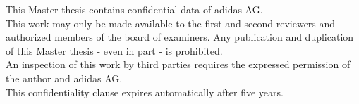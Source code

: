 



This Master thesis contains confidential data of adidas AG. 
\\
This work may only be made available to the first and second reviewers and authorized members of the board of examiners. Any publication and duplication of this Master thesis - even in part - is prohibited.
\\
An inspection of this work by third parties requires the expressed permission of the author and adidas AG.
\\
This confidentiality clause expires automatically after five years.


